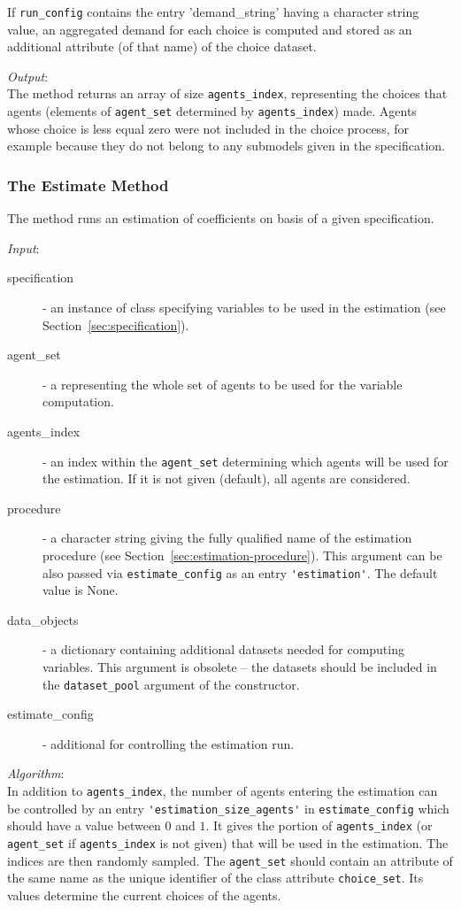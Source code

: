 If \verb|run_config| contains the entry 'demand_string' having a character string value, 
an aggregated demand for each choice is computed and stored as an additional attribute (of that name)
of the choice dataset.

{\it Output}:~\\[1mm]
The method returns an array of size \verb|agents_index|, representing the
choices that agents (elements of \verb|agent_set| determined by
\verb|agents_index|) made. Agents whose choice is less equal zero  were
not included in the choice process, for example because they do not belong to
any submodels given in the specification.

\subsubsection{The Estimate Method}
%
The  method runs an estimation of coefficients on basis of
a given specification.

{\it Input}:
\begin{description}
\item[specification] - an instance of class 
  specifying variables to be used in the estimation (see Section~\ref{sec:specification}).
\item[agent_set] - a  representing the whole set of agents
  to be used for the variable computation.
\item[agents_index] - an index within the \verb|agent_set| determining which
  agents will be used for the estimation. If it is not given (default), all agents are
  considered.
\item[procedure] - a character string giving the fully qualified name of the
  estimation procedure (see Section~\ref{sec:estimation-procedure}). This argument can be also passed via
  \verb|estimate_config| as an entry \verb|'estimation'|. The default value is None.
\item[data_objects] - a dictionary containing additional datasets 
  needed for computing variables. This argument is obsolete -- the datasets should be 
  included in the \verb|dataset_pool| argument of the constructor.
\item[estimate_config] - additional  for controlling the
  estimation run.
\end{description}

{\it Algorithm}:~\\[1mm]
In addition to \verb|agents_index|, the number of agents entering the
estimation can be controlled by an entry \verb|'estimation_size_agents'| in
\verb|estimate_config| which should have a value between $0$ and $1$. It gives
the portion of \verb|agents_index| (or \verb|agent_set| if \verb|agents_index|
is not given) that will be used in the estimation. The indices are then
randomly sampled. The \verb|agent_set| should contain an attribute of the same
name as the unique identifier of the class attribute \verb|choice_set|. Its
values determine the current choices of the agents.

